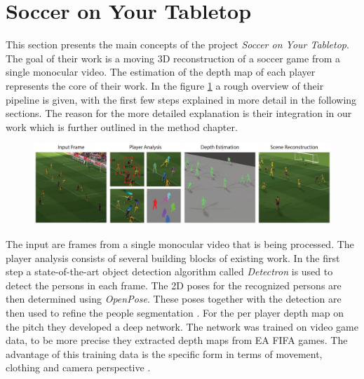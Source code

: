 \section{Soccer on Your Tabletop}\label{tabletop}
This section presents the main concepts of the project \textit{Soccer on Your Tabletop}\cite{tabletop}. The goal of their work is a moving 3D reconstruction of a soccer game from a single monocular video. The estimation of the depth map of each player represents the core of their work. In the figure \ref{fig:tabletop} a rough overview of their pipeline is given, with the first few steps explained in more detail in the following sections. The reason for the more detailed explanation is their integration in our work which is further outlined in the method chapter.
\begin{figure}[h]
	\centering
	\includegraphics[width=1.\textwidth]{./images/tabletop.jpg}
	\label{fig:tabletop}
\end{figure}

The input are frames from a single monocular video that is being processed. The player analysis consists of several building blocks of existing work. In the first step a state-of-the-art object detection algorithm called \textit{Detectron}\cite{detectron} is used to detect the persons in each frame. The 2D poses for the recognized persons are then determined using \textit{OpenPose}\cite{openpose_paper}. These poses together with the detection are then used to refine the people segmentation \cite{segmentation}. For the per player depth map on the pitch they developed a deep network. The network was trained on video game data, to be more precise they extracted depth maps from EA FIFA games. The advantage of this training data is the specific form in terms of movement, clothing and camera perspective \cite{tabletop}. 

